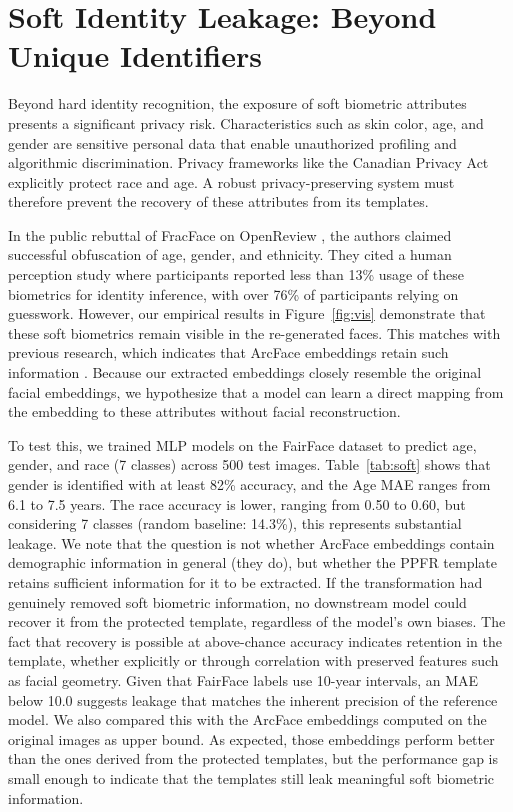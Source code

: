 \section{Soft Identity Leakage: Beyond Unique Identifiers}
Beyond hard identity recognition, the exposure of soft biometric attributes presents a significant privacy risk. Characteristics such as skin color, age, and gender are sensitive personal data that enable unauthorized profiling and algorithmic discrimination. Privacy frameworks like the Canadian Privacy Act \citep{branch_consolidated_2025} explicitly protect race and age. A robust privacy-preserving system must therefore prevent the recovery of these attributes from its templates.

In the public rebuttal of FracFace \cite{dai_fracface_2025} on OpenReview \cite{noauthor_wayback_nodate}, the authors claimed successful obfuscation of age, gender, and ethnicity. They cited a human perception study where participants reported less than 13\% usage of these biometrics for identity inference, with over 76\% of participants relying on guesswork. However, our empirical results in Figure~\ref{fig:vis} demonstrate that these soft biometrics remain visible in the re-generated faces. This matches with previous research, which indicates that ArcFace embeddings retain such information \cite{melzi_multi-ive_2023, osorio-roig_reversing_2023}. Because our extracted embeddings closely resemble the original facial embeddings, we hypothesize that a model can learn a direct mapping from the embedding to these attributes without facial reconstruction.

To test this, we trained MLP models on the FairFace dataset \cite{karkkainen_fairface_2019} to predict age, gender, and race (7 classes) across 500 test images. Table~\ref{tab:soft} shows that gender is identified with at least 82\% accuracy, and the Age MAE ranges from 6.1 to 7.5 years. The race accuracy is lower, ranging from 0.50 to 0.60, but considering 7 classes (random baseline: 14.3\%), this represents substantial leakage. We note that the question is not whether ArcFace embeddings contain demographic information in general (they do), but whether the PPFR template retains sufficient information for it to be extracted. If the transformation had genuinely removed soft biometric information, no downstream model could recover it from the protected template, regardless of the model's own biases. The fact that recovery is possible at above-chance accuracy indicates retention in the template, whether explicitly or through correlation with preserved features such as facial geometry. Given that FairFace labels use 10-year intervals, an MAE below 10.0 suggests leakage that matches the inherent precision of the reference model. We also compared this with the ArcFace embeddings computed on the original images as upper bound. As expected, those embeddings perform better than the ones derived from the protected templates, but the performance gap is small enough to indicate that the templates still leak meaningful soft biometric information.

